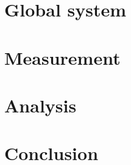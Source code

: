 \documentclass[
    iai, %
    mi, %
]{heig-tb}
\begin{document}
\chapter{Global system}


\chapter{Measurement}


\chapter{Analysis}


\chapter{Conclusion}


\clearpage
\printbibliography

\appendix
\appendixpage
\addappheadtotoc



\label{glossaire}
\printnoidxglossary
\label{index}
\printindex

% 
\end{document}
